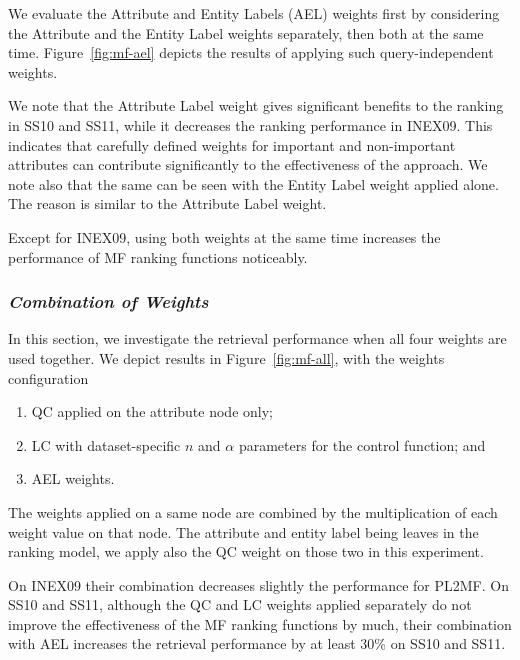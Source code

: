 We evaluate the Attribute and Entity Labels (AEL) weights first by considering the Attribute and the Entity Label weights separately, then both at the same time. Figure~\ref{fig:mf-ael} depicts the results of applying such query-independent weights.

We note that the Attribute Label weight gives significant benefits to the ranking in SS10 and SS11, while it decreases the ranking performance in INEX09. This indicates that carefully defined weights for important and non-important attributes can contribute significantly to the effectiveness of the approach. We note also that the same can be seen with the Entity Label weight applied alone. The reason is similar to the Attribute Label weight.

Except for INEX09, using both weights at the same time increases the performance of MF ranking functions noticeably.

\subsubsection{\emph{Combination of Weights}}
\label{sec:combi-weight-effect}

In this section, we investigate the retrieval performance when all four weights are used together. We depict results in Figure~\ref{fig:mf-all}, with the weights configuration
\begin{enumerate}
    \item QC applied on the attribute node only;
    \item LC with dataset-specific $n$ and $\alpha$ parameters for the control function; and
    \item AEL weights.
\end{enumerate}

The weights applied on a same node are combined by the multiplication of each weight value on that node.
The attribute and entity label being leaves in the ranking model, we apply also the QC weight on those two in this experiment.

On INEX09 their combination decreases slightly the performance for PL2MF. On SS10 and SS11, although the QC and LC weights applied separately do not improve the effectiveness of the MF ranking functions by much, their combination with AEL increases the retrieval performance by at least $30\%$ on SS10 and SS11.

